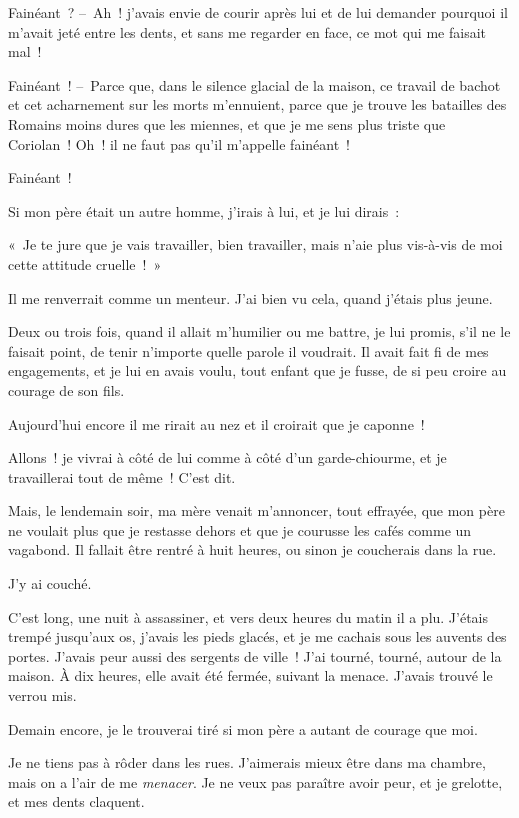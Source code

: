 \documentclass[french,twoside]{book} %
\begin{document}
Fainéant ? – Ah ! j’avais envie de courir après lui et de lui demander pourquoi il m’avait jeté entre les dents, et sans me regarder en face, ce mot qui me faisait mal !\par
Fainéant ! – Parce que, dans le silence glacial de la maison, ce travail de bachot et cet acharnement sur les morts m’ennuient, parce que je trouve les batailles des Romains moins dures que les miennes, et que je me sens plus triste que Coriolan ! Oh ! il ne faut pas qu’il m’appelle fainéant !\par
Fainéant !\par
Si mon père était un autre homme, j’irais à lui, et je lui dirais :\par
« Je te jure que je vais travailler, bien travailler, mais n’aie plus vis-à-vis de moi cette attitude cruelle ! »\par
Il me renverrait comme un menteur. J’ai bien vu cela, quand j’étais plus jeune.\par
Deux ou trois fois, quand il allait m’humilier ou me battre, je lui promis, s’il ne le faisait point, de tenir n’importe quelle parole il voudrait. Il avait fait fi de mes engagements, et je lui en avais voulu, tout enfant que je fusse, de si peu croire au courage de son fils.\par
Aujourd’hui encore il me rirait au nez et il croirait que je caponne !\par
Allons ! je vivrai à côté de lui comme à côté d’un garde-chiourme, et je travaillerai tout de même ! C’est dit.\par
Mais, le lendemain soir, ma mère venait m’annoncer, tout effrayée, que mon père ne voulait plus que je restasse dehors et que je courusse les cafés comme un vagabond. Il fallait être rentré à huit heures, ou sinon je coucherais dans la rue.\par
\bigbreak
\noindent J’y ai couché.\par
C’est long, une nuit à assassiner, et vers deux heures du matin il a plu. J’étais trempé jusqu’aux os, j’avais les pieds glacés, et je me cachais sous les auvents des portes. J’avais peur aussi des sergents de ville ! J’ai tourné, tourné, autour de la maison. À dix heures, elle avait été fermée, suivant la menace. J’avais trouvé le verrou mis.\par
Demain encore, je le trouverai tiré si mon père a autant de courage que moi.\par
Je ne tiens pas à rôder dans les rues. J’aimerais mieux être dans ma chambre, mais on a l’air de me \emph{menacer}. Je ne veux pas paraître avoir peur, et je grelotte, et mes dents claquent.\par
\end{document}
